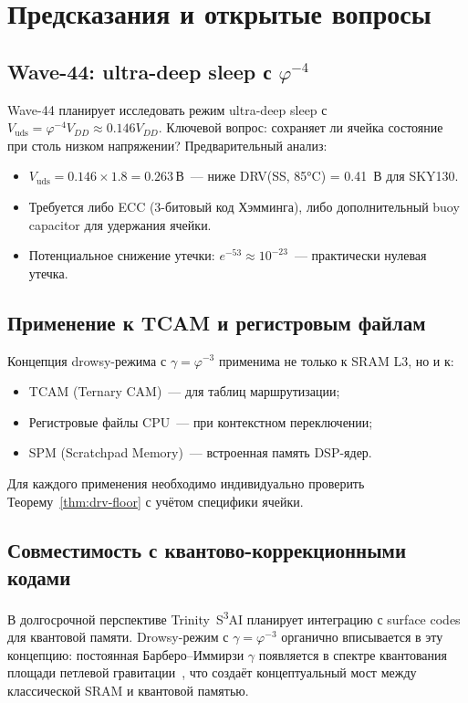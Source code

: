 \section{Предсказания и открытые вопросы}
\label{sec:glava89-open}

\subsection{Wave-44: ultra-deep sleep с $\varphi^{-4}$}

Wave-44 планирует исследовать режим ultra-deep sleep
с $V_\mathrm{uds} = \varphi^{-4} V_{DD} \approx 0.146 V_{DD}$.
Ключевой вопрос: сохраняет ли ячейка состояние при столь низком напряжении?
Предварительный анализ:
\begin{itemize}
  \item $V_\mathrm{uds} = 0.146 \times 1.8 = 0.263\,\text{В}$~---
        ниже DRV(SS, 85°C) = 0.41~В для SKY130.
  \item Требуется либо ECC (3-битовый код Хэмминга),
        либо дополнительный buoy capacitor для удержания ячейки.
  \item Потенциальное снижение утечки: $e^{-53} \approx 10^{-23}$~---
        практически нулевая утечка.
\end{itemize}

\subsection{Применение к TCAM и регистровым файлам}

Концепция drowsy-режима с $\gamma = \varphi^{-3}$ применима не только к SRAM L3,
но и к:
\begin{itemize}
  \item TCAM (Ternary CAM)~--- для таблиц маршрутизации;
  \item Регистровые файлы CPU~--- при контекстном переключении;
  \item SPM (Scratchpad Memory)~--- встроенная память DSP-ядер.
\end{itemize}
Для каждого применения необходимо индивидуально проверить
Теорему~\ref{thm:drv-floor} с учётом специфики ячейки.

\subsection{Совместимость с квантово-коррекционными кодами}

В долгосрочной перспективе Trinity~S\textsuperscript{3}AI
планирует интеграцию с surface codes для квантовой памяти.
Drowsy-режим с $\gamma = \varphi^{-3}$ органично вписывается
в эту концепцию: постоянная Барберо--Иммирзи $\gamma$
появляется в спектре квантования площади петлевой гравитации~\cite{BarberoImmirzi1995},
что создаёт концептуальный мост между классической SRAM и квантовой памятью.

